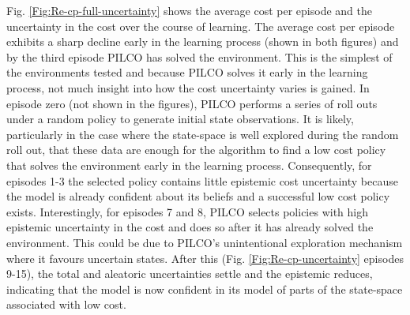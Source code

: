 Fig. \ref{Fig:Re-cp-full-uncertainty} shows the average cost per episode and the uncertainty in the cost over the course of learning. The average cost per episode exhibits a sharp decline early in the learning process (shown in both figures) and by the third episode PILCO has solved the environment. This is the simplest of the environments tested and because PILCO solves it early in the learning process, not much insight into how the cost uncertainty varies is gained. In episode zero (not shown in the figures), PILCO performs a series of roll outs under a random policy to generate initial state observations. It is likely, particularly in the case where the state-space is well explored during the random roll out, that these data are enough for the algorithm to find a low cost policy that solves the environment early in the learning process. Consequently, for episodes 1-3 the selected policy contains little epistemic cost uncertainty because the model is already confident about its beliefs and a successful low cost policy exists. Interestingly, for episodes 7 and 8, PILCO selects policies with high epistemic uncertainty in the cost and does so after it has already solved the environment. This could be due to PILCO's unintentional exploration mechanism where it favours uncertain states. After this (Fig. \ref{Fig:Re-cp-uncertainty} episodes 9-15), the total and aleatoric uncertainties settle and the epistemic reduces, indicating that the model is now confident in its model of parts of the state-space associated with low cost.





